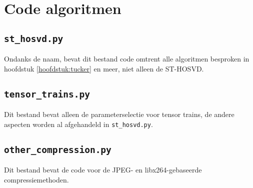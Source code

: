 \chapter{Code algoritmen}
\label{app:algoritmen}

\section{\texttt{st\_hosvd.py}}

Ondanks de naam, bevat dit bestand code omtrent alle algoritmen besproken in hoofdstuk \ref{hoofdstuk:tucker} en meer, niet alleen de ST-HOSVD.\\



\section{\texttt{tensor\_trains.py}}

Dit bestand bevat alleen de parameterselectie voor tensor trains, de andere aspecten worden al afgehandeld in \texttt{st\_hosvd.py}.\\



\section{\texttt{other\_compression.py}}

Dit bestand bevat de code voor de JPEG- en libx264-gebaseerde compressiemethoden.\\

